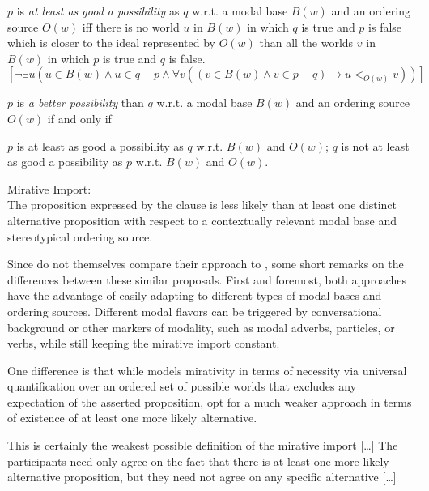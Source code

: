 \begin{exe}
\ex\label{ex:asgoodpossibilityBIANCHIETAL}
	$p$ is \textit{at least as good a possibility} as $q$ w.r.t. a modal base $B(w)$ and an ordering source $O(w)$ iff there is no world $u$ in $B(w)$ in which $q$ is true and $p$ is false which is closer to the ideal represented by $O(w)$ than all the worlds $v$ in $B(w)$ in which $p$ is true and $q$ is false.
	\[
		[\neg \exists u (u \in B(w) \land u \in q-p \land  \forall v((v\in B(w) \land v \in p-q) \rightarrow u <_{O(w)} v))]
	\]

\ex\label{ex:betterpossibilityBIANCHIETAL}
	$p$ is \textit{a better possibility} than $q$ w.r.t. a modal base $B(w)$ and an ordering source $O(w)$ if and only if
	\begin{xlist}
		\ex $p$ is at least as good a possibility as $q$ w.r.t. $B(w)$ and $O(w)$;
		\ex $q$ is not at least as good a possibility as $p$ w.r.t. $B(w)$ and $O(w)$.
	\end{xlist}
\ex\label{ex:mirativeimportBIANCHIETAL} Mirative Import:\\
	The proposition expressed by the clause is less likely than at least one distinct alternative proposition with respect to a contextually relevant modal base and stereotypical ordering source.\hfill \hbox{\citep[12--13]{BianchiBocciCruschina.2016}}
\end{exe}

Since \citet{BianchiBocciCruschina.2016} do not themselves compare their approach to \citet{Wu.2008}, some short remarks on the differences between these similar proposals. First and foremost, both approaches have the advantage of easily adapting to different types of modal bases and ordering sources. Different modal flavors can be triggered by conversational background or other markers of modality, such as modal adverbs, particles, or verbs, while still keeping the mirative import constant.

One difference is that while \citet{Wu.2008} models mirativity in terms of necessity via universal quantification over an ordered set of possible worlds that excludes any expectation of the asserted proposition, \citet[15]{BianchiBocciCruschina.2016} opt for a much weaker approach in terms of existence of at least one more likely alternative. 

\begin{displayquote}
	This is certainly the weakest possible definition of the mirative import [\ldots]
	The participants need only agree on the fact that there is at least one more likely alternative proposition, but they need not agree on any specific alternative [\ldots]
\end{displayquote}

